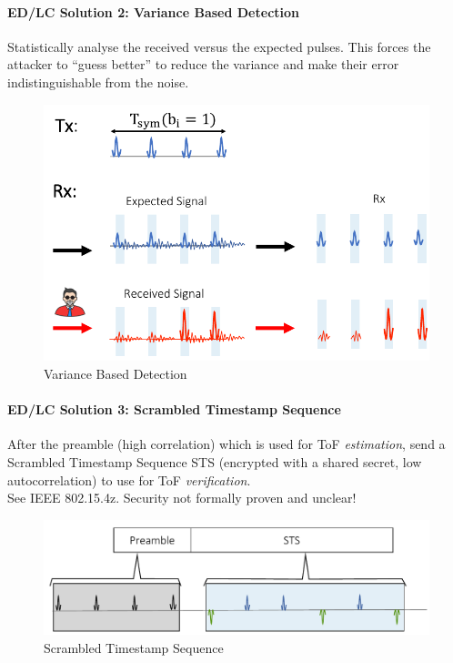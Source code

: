 \paragraph{ED/LC Solution 2: Variance Based Detection}
Statistically analyse the received versus the expected pulses.
This forces the attacker to ``guess better'' to reduce the variance and make their error indistinguishable from the noise.

\begin{figure}
	\centering
	\includegraphics[scale=0.4]{images/5-variance-based.png}
	\caption{Variance Based Detection}
	\label{fig:variance-based}
\end{figure}

\paragraph{ED/LC Solution 3: Scrambled Timestamp Sequence}

After the preamble (high correlation) which is used for ToF \textit{estimation},
send a Scrambled Timestamp Sequence STS (encrypted with a shared secret, low autocorrelation) to use for ToF \textit{verification}.
\\
See IEEE 802.15.4z.
Security not formally proven and unclear!

\begin{figure}
	\centering
	\includegraphics[scale=0.35]{images/5-scrambled-timestamp.png}
	\caption{Scrambled Timestamp Sequence}
	\label{fig:scrambled-timestamp}
\end{figure}

